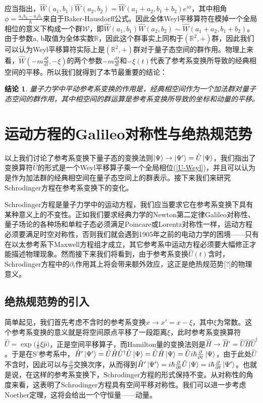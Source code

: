 \documentclass[a4paper]{article}
\newtheorem*{conclusion}{结论}
\begin{document}
        应当指出，$\hat{W}(a_1, b_1)\hat{W}(a_2, b_2)=\hat{W}(a_1+a_2, b_1+b_2)e^{i\phi}$，其中相角$\phi=\frac{a_1b_2-a_2b_1}{\hbar}$来自于Baker-Hausdorff公式。因此全体Weyl平移算符在模掉一个全局相位的意义下构成一个群$\mathcal{W}$，即$\hat{W}(a_1, b_1)\hat{W}(a_2, b_2)\sim\hat{W}(a_1+a_2, b_1+b_2)$。由于参数a, b取值为全体实数$\mathbb{R}$，因此这个群事实上同构于$(\mathbb{R}^2,+)$群，因此我们可以认为Weyl平移算符实际上是$(\mathbb{R}^2,+)$群对于量子态空间的群作用。物理上来看，$\hat{W}(-m\frac{d\xi}{dt}, -\xi)$的两个参数$-m\frac{d\xi}{dt}$和$-\xi(t)$代表了参考系变换所导致的经典相空间的平移。所以我们就得到了本节最重要的结论：

        \begin{conclusion}
            量子力学中平动参考系变换的作用是，经典相空间作为一个加法群对量子态空间的群作用，其中相空间的群运算是参考系变换所导致的坐标和动量的平移。
        \end{conclusion}
    

    \section{运动方程的Galileo对称性与绝热规范势}

        以上我们讨论了参考系变换下量子态的变换法则$\ket{\Psi}\to\ket{\Psi'}=\hat{U}\ket{\Psi}$，我们指出了变换算符$\hat{U}$的形式是一个Weyl平移算子乘一个全局相位(\ref{U-Weyl})，并且可以认为是作为加法群的经典相空间在量子态空间上的群表示。接下来我们来研究Schrodinger方程在参考系变换下的变化。

        Schrodinger方程是量子力学中的运动方程，我们应当要求它在参考系变换下具有某种意义上的不变性。正如我们要求经典力学的Newton第二定律Galileo对称性、量子场论的各种场和单粒子态必须满足Poincare或Lorentz对称性一样，运动方程必须要满足时空对称性，否则我们就会遇到1905年之前的电动力学的困境——只有在以太参考系下Maxwell方程组才成立，其它参考系中运动方程必须要大幅修正才能描述物理现象。然而接下来我们将看到，由于参考系变换$\hat{U}(t)$含时，Schrodinger方程中的$\partial_t$作用其上将会带来额外效应，这正是绝热规范势[?]的物理意义。

        \subsection{绝热规范势的引入}

        简单起见，我们首先考虑不含时的参考系变换$x\rightarrow x'=x-\xi$，其中$\xi$为常数。这个参考系变换的意义就是将空间原点平移了一段距离$\xi$，此时参考系变换算符$\hat{U}=\exp\big(\frac{i}{\hbar}\xi\hat{p} \big)$，正是空间平移算子，而Hamilton量的变换法则是$\hat{H}\rightarrow \hat{H}'=\hat{U}\hat{H}\hat{U}^\dagger$。于是在S'参考系中，$\hat{H}'\ket{\Psi'}=\hat{U}\hat{H}\hat{U}^\dagger\hat{U}\ket{\Psi}=\hat{U}\hat{H}\ket{\Psi}=\hat{U} i\hbar\frac{\partial}{\partial t}\ket{\Psi}$，由于此处$\hat{U}$不含时，因此可以与$\frac{\partial}{\partial t}$交换次序，从而得到$\hat{H}'\ket{\Psi'}=i\hbar\frac{\partial}{\partial t}\hat{U}\ket{\Psi}=i\hbar\frac{\partial}{\partial t}\ket{\Psi'}$。也就是说，在这样的参考系变换下，Schrodinger方程的形式保持不变。从对称性的角度来看，这表明了Schrodinger方程具有空间平移对称性。我们可以进一步考虑Noether定理，这将会给出一个守恒量——动量。
\end{document}
